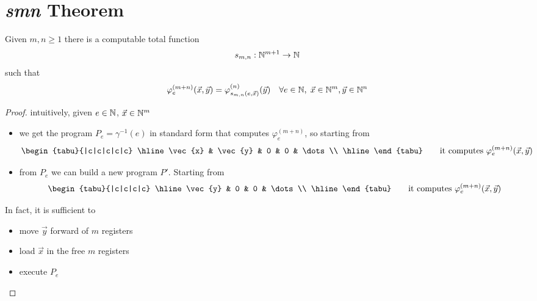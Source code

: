 \section{\emph{smn} Theorem}
\begin{theorem}
  Given $m, n \geq 1$ there is a computable total function
  \[s_{m,n} : \mathbb{N}^{m+1} \rightarrow \mathbb{N}\] such that 
  \[
    \varphi_e^{(m+n)}(\vec{x},\vec{y}) = \varphi_{s_{m,n}(e,
      \vec{x})}^{(n)}(\vec{y}) \quad \forall e \in \mathbb{N}, \; \vec{x} \in
    \mathbb{N}^m, \vec{y} \in \mathbb{N}^n
  \]
  \begin{proof}
    intuitively, given $e \in \mathbb{N}$, $\vec{x}\in \mathbb{N}^m$
    \begin{itemize}
    \item we get the program
      $P_e = \gamma^{-1}(e)$ in standard form that computes $\varphi_e^{(m+n)}$,
      so starting from
      \[
        \begin{tabu}{|c|c|c|c|c}
          \hline
          \vec{x} & \vec{y} & 0 & 0 & \dots \\ \hline
        \end{tabu}
        \quad \quad \mbox{it computes }
        \varphi_e^{(m+n)}(\vec{x},\vec{y})
      \]
    \item from $P_e$ we can build a new program $P'$.
      Starting from
      \[
        \begin{tabu}{|c|c|c|c}
          \hline
          \vec{y} & 0 & 0 & \dots \\ \hline
        \end{tabu}
        \quad \quad \mbox{it computes }
        \varphi_e^{(m+n)}(\vec{x},\vec{y})
      \]
    \end{itemize}

    In fact, it is sufficient to
    \begin{itemize}
    \item move $\vec{y}$ forward of $m$ registers
    \item load $\vec{x}$ in the free $m$ registers
    \item execute $P_e$
    \end{itemize}


\end{proof}
\end{theorem}

